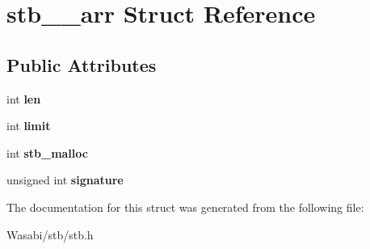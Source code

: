 \hypertarget{structstb____arr}{}\section{stb\+\_\+\+\_\+arr Struct Reference}
\label{structstb____arr}
\subsection*{Public Attributes}
\begin{DoxyCompactItemize}
\item 
int {\bfseries len}\hypertarget{structstb____arr_acd941aed9dd5c1b35f808015f0fdabd6}{}\label{structstb____arr_acd941aed9dd5c1b35f808015f0fdabd6}

\item 
int {\bfseries limit}\hypertarget{structstb____arr_a9c55b19519ed39eb476ddf62e0f9cd4c}{}\label{structstb____arr_a9c55b19519ed39eb476ddf62e0f9cd4c}

\item 
int {\bfseries stb\+\_\+malloc}\hypertarget{structstb____arr_a5fb8ca979b5f99143d8f12d8e5475b5a}{}\label{structstb____arr_a5fb8ca979b5f99143d8f12d8e5475b5a}

\item 
unsigned int {\bfseries signature}\hypertarget{structstb____arr_a65124f8b11e048ba49709edd3749bd45}{}\label{structstb____arr_a65124f8b11e048ba49709edd3749bd45}

\end{DoxyCompactItemize}


The documentation for this struct was generated from the following file\+:\begin{DoxyCompactItemize}
\item 
Wasabi/stb/stb.\+h\end{DoxyCompactItemize}
